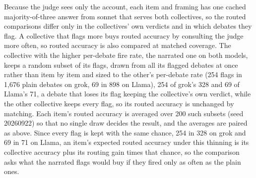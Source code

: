 Because the judge sees only the account, each item and framing has one cached
majority-of-three answer from sonnet that serves both collectives, so the
routed comparisons differ only in the collectives' own verdicts and in which
debates they flag.
A collective that flags more buys routed accuracy by consulting the judge
more often, so routed accuracy is also compared at matched coverage. The
collective with the higher per-debate fire rate, the narrated one on both
models, keeps a random subset of its flags, drawn from all its flagged
debates at once rather than item by item and sized to the other's per-debate
rate (254 flags in 1,676 plain debates on grok, 69 in 898 on Llama), 254 of
grok's 328 and 69 of Llama's 71, a debate that loses its flag
keeping the collective's own verdict, while the other collective keeps every
flag, so its routed accuracy is unchanged by matching. Each item's routed
accuracy is averaged over 200 such subsets (seed 20260922) so that no single draw decides
the result, and the averages are paired as above. Since every flag is kept
with the same chance, 254 in 328 on grok and 69 in 71 on Llama, an item's
expected routed accuracy under this thinning is its collective accuracy plus
its routing gain times that chance, so the comparison asks what the narrated
flags would buy if they fired only as often as the plain ones.
